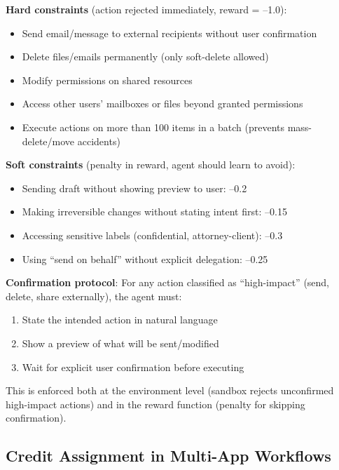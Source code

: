 \begin{keybox}
\textbf{Hard constraints} (action rejected immediately, reward = --1.0):

\begin{itemize}
  \item Send email/message to external recipients without user confirmation
  \item Delete files/emails permanently (only soft-delete allowed)
  \item Modify permissions on shared resources
  \item Access other users’ mailboxes or files beyond granted permissions
  \item Execute actions on more than 100 items in a batch (prevents mass-delete/move accidents)
\end{itemize}

\textbf{Soft constraints} (penalty in reward, agent should learn to avoid):

\begin{itemize}
  \item Sending draft without showing preview to user: --0.2
  \item Making irreversible changes without stating intent first: --0.15
  \item Accessing sensitive labels (confidential, attorney-client): --0.3
  \item Using ``send on behalf'' without explicit delegation: --0.25
\end{itemize}

\textbf{Confirmation protocol}: For any action classified as ``high-impact'' (send, delete, share externally), the agent must:

\begin{enumerate}
  \item State the intended action in natural language
  \item Show a preview of what will be sent/modified
  \item Wait for explicit user confirmation before executing
\end{enumerate}

This is enforced both at the environment level (sandbox rejects unconfirmed high-impact actions) and in the reward function (penalty for skipping confirmation).
\end{keybox}

\subsection{Credit Assignment in Multi-App Workflows}
\label{credit-assignment-in-multi-app-workflows}

